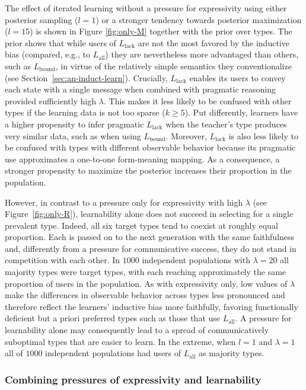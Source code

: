 \documentclass[a4paper, 11pt]{article}
\theoremstyle{Satz}
\newcommand{\mylang}[1]{\ensuremath{L_{\text{#1}}}\xspace} %
\newcommand{\Lall}{\mylang{all}}
\newcommand{\Lbound}{\mylang{bound}}
\newcommand{\Llack}{\mylang{lack}}
\begin{document}
The effect of iterated learning without a pressure for expressivity using either posterior
sampling ($l = 1$) or a stronger tendency towards posterior maximization ($l = 15$) is shown in
Figure \ref{fig:only-M} together with the prior over types. The prior shows that while users of
$\Llack$ are not the most favored by the inductive bias (compared, e.g., to $\Lall$) they are
nevertheless more advantaged than others, such as $\Lbound$, in virtue of the relatively simple
semantics they conventionalize (see Section~\ref{sec:an-induct-learn}). Crucially, $\Llack$
enables its users to convey each state with a single message when combined with pragmatic
reasoning provided sufficiently high $\lambda$. This makes it less likely to be confused with
other types if the learning data is not too sparse ($k \geq 5$). Put differently, learners have
a higher propensity to infer pragmatic $\Llack$ when the teacher's type produces very similar
data, such as when using $\Lbound$. Moreover, $\Llack$ is also less likely to be confused with
types with different observable behavior because its pragmatic use approximates a one-to-one
form-meaning mapping. As a consequence, a stronger propensity to maximize the posterior
increases their proportion in the population.

However, in contrast to a pressure only for expressivity with high $\lambda$ (see
Figure~\ref{fig:only-R}), learnability alone does not succeed in selecting for a single
prevalent type. Indeed, all six target types tend to coexist at roughly equal proportion. Each
is passed on to the next generation with the same faithfulness and, differently from a pressure
for communicative success, they do not stand in competition with each other. In $1000$
independent populations with $\lambda = 20$ all majority types were target types,
with each reaching approximately the same proportion of users in the population. As
with expressivity only, low values of $\lambda$ make the differences in observable behavior
across types less pronounced and therefore reflect the learners' inductive bias more
faithfully, favoring functionally deficient but a priori preferred types such as those that use
$\Lall$. A pressure for learnability alone may consequently lead to a spread of communicatively
suboptimal types that are easier to learn. In the extreme, when $l = 1$ and $\lambda = 1$ all
of $1000$ independent populations had users of $\Lall$ as majority types.

\subsubsection{Combining pressures of expressivity and learnability}
\end{document}
